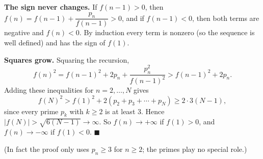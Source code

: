 \textbf{The sign never changes.} If $f(n-1)>0$, then $f(n)=f(n-1)+\dfrac{p_n}{f(n-1)}>0$, and if $f(n-1)<0$, then both terms are negative and $f(n)<0$. By induction every term is nonzero (so the sequence is well defined) and has the sign of $f(1)$.

\textbf{Squares grow.} Squaring the recursion,
\[f(n)^2=f(n-1)^2+2p_n+\dfrac{p_n^2}{f(n-1)^2}>f(n-1)^2+2p_n.\]
Adding these inequalities for $n=2,\dots,N$ gives
\[f(N)^2>f(1)^2+2\left(p_2+p_3+\cdots+p_N\right)\ge2\cdot3(N-1),\]
since every prime $p_k$ with $k\ge2$ is at least $3$. Hence $|f(N)|>\sqrt{6(N-1)}\to\infty$. So $f(n)\to+\infty$ if $f(1)>0$, and $f(n)\to-\infty$ if $f(1)<0$. $\blacksquare$

(In fact the proof only uses $p_n\ge3$ for $n\ge2$; the primes play no special role.)
